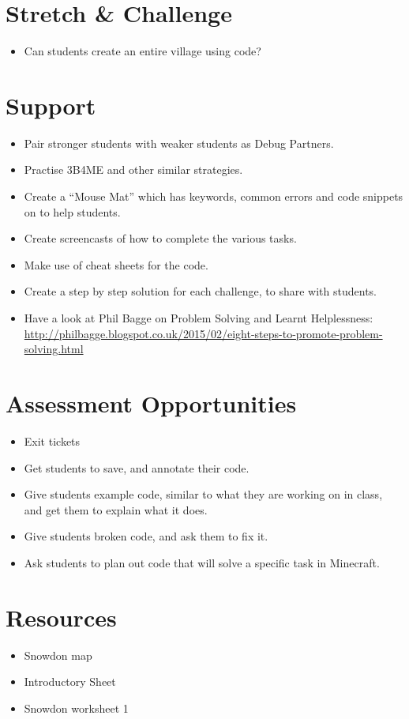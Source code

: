 \documentclass{geocraft-lesson-plan}
\begin{document}
\section*{Stretch \& Challenge}
\begin{itemize}
\item Can students create an entire village using code?
\end{itemize}

\section*{Support}
\begin{itemize}
\item Pair stronger students with weaker students as Debug Partners.
\item Practise 3B4ME and other similar strategies.
\item Create a ``Mouse Mat'' which has keywords, common errors and code snippets on to help students.
\item Create screencasts of how to complete the various tasks.
\item Make use of cheat sheets for the code.
\item Create a step by step solution for each challenge, to share with students.
\item Have a look at Phil Bagge on Problem Solving and Learnt Helplessness: 
  {\textcolor{greenish}
    {\url{http://philbagge.blogspot.co.uk/2015/02/eight-steps-to-promote-problem-solving.html}}}
\end{itemize}

\section*{Assessment Opportunities}
\begin{itemize}
\item Exit tickets
\item Get students to save, and annotate their code.
\item Give students example code, similar to what they are working on in class, and get them to explain what it does.
\item Give students broken code, and ask them to fix it.
\item Ask students to plan out code that will solve a specific task in Minecraft.
\end{itemize}



\section*{Resources}
\begin{itemize}
\item Snowdon map
\item Introductory Sheet
\item Snowdon worksheet 1
\end{itemize}

\end{document}
